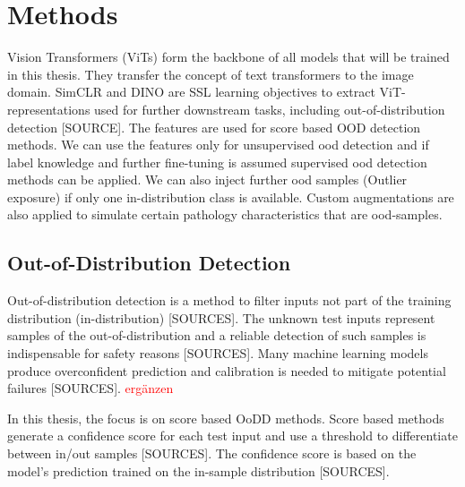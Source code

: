 \section{Methods}
Vision Transformers (ViTs) form the backbone of all models that will be trained in this thesis.
They transfer the concept of text transformers to the image domain.
SimCLR and DINO are SSL learning objectives to extract ViT-representations used for further downstream tasks, including out-of-distribution detection [SOURCE].
The features are used for score based OOD detection methods. 
We can use the features only for unsupervised ood detection and if label knowledge and further fine-tuning is assumed supervised ood detection methods can be applied.
We can also inject further ood samples (Outlier exposure) if only one in-distribution class is available. 
Custom augmentations are also applied to simulate certain pathology characteristics that are ood-samples.
\subsection{Out-of-Distribution Detection}
\label{section: Out-of-Distribution Detection}
Out-of-distribution detection is a method to filter inputs not part of the training distribution (in-distribution) [SOURCES].
The unknown test inputs represent samples of the out-of-distribution and a reliable detection of such samples is indispensable for safety reasons [SOURCES].
Many machine learning models produce overconfident prediction and calibration is needed to mitigate potential failures [SOURCES].
\textcolor{red}{ergänzen}
\par
In this thesis, the focus is on score based OoDD methods.
Score based methods generate a confidence score for each test input and use a threshold to differentiate between in/out samples [SOURCES].
The confidence score is based on the model's prediction trained on the in-sample distribution [SOURCES].
